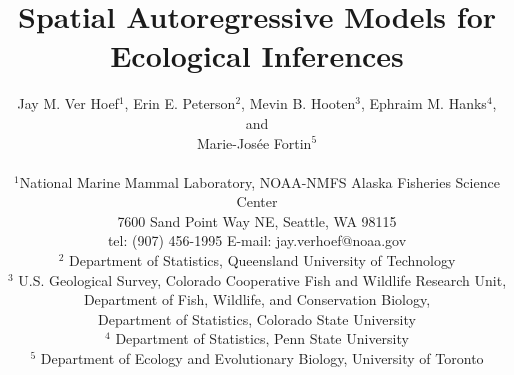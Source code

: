 \documentclass[11pt, titlepage]{article}\usepackage[]{graphicx}\usepackage[]{color}
\begin{document}

\titlepage
\title {Spatial Autoregressive Models for Ecological Inferences}
\author{Jay M. Ver Hoef$^1$, Erin E. Peterson$^2$, Mevin B. Hooten$^3$, Ephraim M. Hanks$^4$, and \\
	Marie-Jos\'{e}e Fortin$^5$ \\
\hrulefill \\ 
$^1$National Marine Mammal Laboratory, NOAA-NMFS Alaska Fisheries Science Center\\
7600 Sand Point Way NE, Seattle, WA 98115\\
tel: (907) 456-1995 \hspace{.5cm} E-mail: jay.verhoef@noaa.gov\\
$^2$ Department of Statistics, Queensland University of Technology \\ 
$^3$ U.S. Geological Survey, Colorado Cooperative Fish and Wildlife Research Unit, \\
Department of Fish, Wildlife, and Conservation Biology, \\
Department of Statistics, Colorado State University \\
$^4$ Department of Statistics, Penn State University \\
$^5$ Department of Ecology and Evolutionary Biology, University of Toronto \\
\hrulefill \\
}

\maketitle

\end{document}

